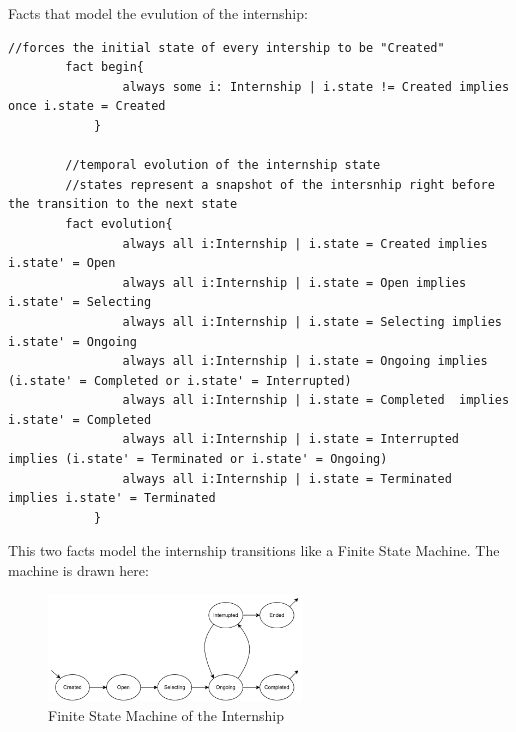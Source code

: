 \par Facts that model the evulution of the internship:

\begin{lstlisting}[language=Alloy]
        //forces the initial state of every intership to be "Created"
        fact begin{
                always some i: Internship | i.state != Created implies once i.state = Created
            }
        
        //temporal evolution of the internship state
        //states represent a snapshot of the intersnhip right before the transition to the next state
        fact evolution{
                always all i:Internship | i.state = Created implies  i.state' = Open
                always all i:Internship | i.state = Open implies  i.state' = Selecting
                always all i:Internship | i.state = Selecting implies  i.state' = Ongoing
                always all i:Internship | i.state = Ongoing implies (i.state' = Completed or i.state' = Interrupted)
                always all i:Internship | i.state = Completed  implies i.state' = Completed
                always all i:Internship | i.state = Interrupted  implies (i.state' = Terminated or i.state' = Ongoing)
                always all i:Internship | i.state = Terminated  implies i.state' = Terminated
            }
\end{lstlisting}

\par This two facts model the internship transitions like a Finite State Machine. The machine is drawn here:

\begin{figure}[H]
    \centering
    \includegraphics[width=0.6\textwidth]{Images/Alloy_images/FSM.pdf}
    \caption{Finite State Machine of the Internship}
\end{figure}

